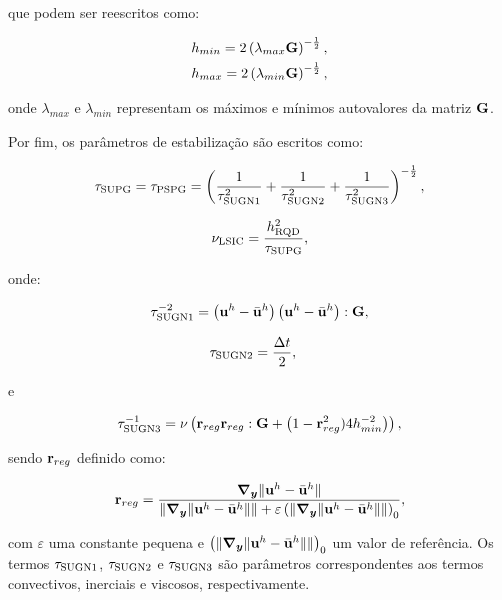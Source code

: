 \documentclass[tese_patricia]{subfiles}%
\begin{document}
\noindent que podem ser reescritos como:

\begin{align}
	h_{min} = 2\left(\lambda_{max}\mathbf{G}\right)^{-\frac{1}{2}}, \\
	h_{max} = 2\left(\lambda_{min}\mathbf{G}\right)^{-\frac{1}{2}},
\end{align}

\noindent onde $\lambda_{max}$ e $\lambda_{min}$ representam os máximos e mínimos autovalores da matriz $\mathbf{G}$. 

Por fim, os parâmetros de estabilização são escritos como:

\begin{align}
	\tau_{\mathrm{SUPG}} = \tau_{\mathrm{PSPG}} =\left(\frac{1}{\tau_{\mathrm{SUGN1}}^2} + \frac{1}{\tau_{\mathrm{SUGN2}}^2} + \frac{1}{\tau_{\mathrm{SUGN3}}^2} \right)^{-\frac{1}{2}},
\end{align}

\begin{align}
	\nu_{\mathrm{LSIC}} = \frac{h_{\mathrm{RQD}}^2}{\tau_{\mathrm{SUPG}}},
\end{align}

\noindent onde:

\begin{align}
	\tau_{\mathrm{SUGN1}}^{-2} = \left(\mathbf{u}^h - \bar{\mathbf{u}}^h \right) \left(\mathbf{u}^h - \bar{\mathbf{u}}^h \right) : \mathbf{G} ,
\end{align}

\begin{align}
	\tau_{\mathrm{SUGN2}}&=\frac{\Delta t}{2},
\end{align}

\noindent e

\begin{align}
	\tau_{\mathrm{SUGN3}}^{-1} = \nu \left(\mathbf{r}_{reg}\mathbf{r}_{reg} : \mathbf{G} + \left(1 - \mathbf{r}_{reg}^2)4h_{min}^{-2} \right)\right) ,
\end{align}

\noindent sendo $\mathbf{r}_{reg}$ definido como:

\begin{align}
	\mathbf{r}_{reg} =\frac{\boldsymbol{\nabla_y} \lVert\mathbf{u}^h - \bar{\mathbf{u}}^h\rVert}{\lVert \boldsymbol{\nabla_y} \lVert\mathbf{u}^h - \bar{\mathbf{u}}^h\rVert\rVert + \varepsilon\left(\lVert \boldsymbol{\nabla_y} \lVert\mathbf{u}^h - \bar{\mathbf{u}}^h\rVert\rVert\right)_0},
\end{align}

\noindent com $\varepsilon$ uma constante pequena e $\left(\lVert \boldsymbol{\nabla_y} \lVert\mathbf{u}^h- \bar{\mathbf{u}}^h\rVert\rVert\right)_0$ um valor de referência. Os termos $\tau_{\mathrm{SUGN1}}$, $\tau_{\mathrm{SUGN2}}$ e $\tau_{\mathrm{SUGN3}}$ são parâmetros correspondentes aos termos convectivos, inerciais e viscosos, respectivamente.
\end{document}
